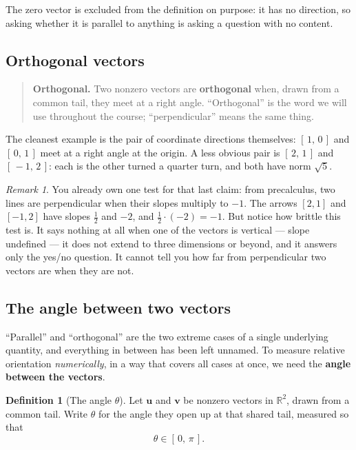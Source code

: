 \documentclass[11pt]{article}
\theoremstyle{definition}
\newtheorem{defn}{Definition}
\theoremstyle{remark}
\newtheorem*{rmk}{Remark}
\newcommand{\R}{\mathbb{R}}
\newcommand{\vc}[1]{\mathbf{#1}}
\begin{document}
\noindent The zero vector is excluded from the definition on purpose: it has no
direction, so asking whether it is parallel to anything is asking a question
with no content.

\subsection{Orthogonal vectors}
\begin{quote}
\textbf{Orthogonal.} Two nonzero vectors are \textbf{orthogonal} when, drawn
from a common tail, they meet at a right angle. ``Orthogonal'' is the word we
will use throughout the course; ``perpendicular'' means the same thing.
\end{quote}

\noindent The cleanest example is the pair of coordinate directions themselves:
$[\,1,\,0\,]$ and $[\,0,\,1\,]$ meet at a right angle at the origin. A less
obvious pair is $[\,2,\,1\,]$ and $[\,-1,\,2\,]$: each is the other turned a
quarter turn, and both have norm $\sqrt5$.

\begin{rmk}
You already own one test for that last claim: from precalculus, two lines are
perpendicular when their slopes multiply to $-1$. The arrows $[2,1]$ and
$[-1,2]$ have slopes $\tfrac12$ and $-2$, and $\tfrac12\cdot(-2)=-1$. But notice
how brittle this test is. It says nothing at all when one of the vectors is
vertical --- slope undefined --- it does not extend to three dimensions or
beyond, and it answers only the yes/no question. It cannot tell you how far from
perpendicular two vectors are when they are not.
\end{rmk}

\subsection{The angle between two vectors}
``Parallel'' and ``orthogonal'' are the two extreme cases of a single underlying
quantity, and everything in between has been left unnamed. To measure relative
orientation \emph{numerically}, in a way that covers all cases at once, we need
the \textbf{angle between the vectors}.

\begin{defn}[The angle $\theta$]
Let $\vc{u}$ and $\vc{v}$ be nonzero vectors in $\R^{2}$, drawn from a common
tail. Write $\theta$ for the angle they open up at that shared tail, measured so
that
\[
  \theta\in[\,0,\,\pi\,].
\]
\end{defn}
\end{document}
